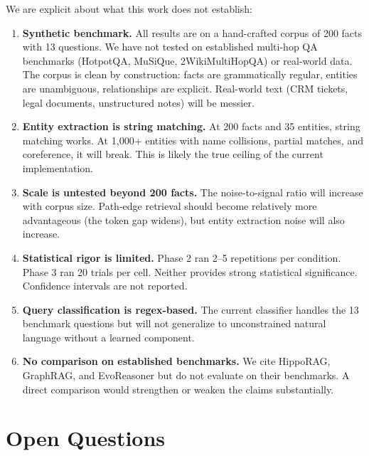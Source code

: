 \documentclass[11pt,a4paper]{article}
\begin{document}
We are explicit about what this work does not establish:

\begin{enumerate}[leftmargin=*]
    \item \textbf{Synthetic benchmark.} All results are on a hand-crafted corpus of 200 facts with 13 questions. We have not tested on established multi-hop QA benchmarks (HotpotQA, MuSiQue, 2WikiMultiHopQA) or real-world data. The corpus is clean by construction: facts are grammatically regular, entities are unambiguous, relationships are explicit. Real-world text (CRM tickets, legal documents, unstructured notes) will be messier.

    \item \textbf{Entity extraction is string matching.} At 200 facts and 35 entities, string matching works. At 1{,}000+ entities with name collisions, partial matches, and coreference, it will break. This is likely the true ceiling of the current implementation.

    \item \textbf{Scale is untested beyond 200 facts.} The noise-to-signal ratio will increase with corpus size. Path-edge retrieval should become relatively more advantageous (the token gap widens), but entity extraction noise will also increase.

    \item \textbf{Statistical rigor is limited.} Phase 2 ran 2--5 repetitions per condition. Phase 3 ran 20 trials per cell. Neither provides strong statistical significance. Confidence intervals are not reported.

    \item \textbf{Query classification is regex-based.} The current classifier handles the 13 benchmark questions but will not generalize to unconstrained natural language without a learned component.

    \item \textbf{No comparison on established benchmarks.} We cite HippoRAG, GraphRAG, and EvoReasoner but do not evaluate on their benchmarks. A direct comparison would strengthen or weaken the claims substantially.
\end{enumerate}

\section{Open Questions}
\label{sec:open}
\end{document}
